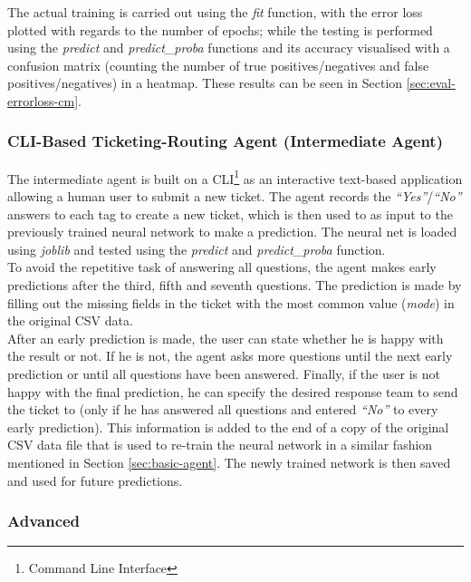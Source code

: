 \documentclass[letterpaper,12pt]{article}
\begin{document}
The actual training is carried out using the \textit{fit} function, with the error loss plotted with regards to the number of epochs; while the testing is performed using the \textit{predict} and \textit{predict\_proba} functions and its accuracy visualised with a confusion matrix (counting the number of true positives/negatives and false positives/negatives) in a heatmap. These results can be seen in Section \ref{sec:eval-errorloss-cm}.


\subsubsection{CLI-Based Ticketing-Routing Agent (Intermediate Agent)}

The intermediate agent is built on a CLI\footnote{Command Line Interface} as an interactive text-based application allowing a human user to submit a new ticket. The agent records the \textit{``Yes''}/\textit{``No''} answers to each tag to create a new ticket, which is then used to as input to the previously trained neural network to make a prediction. The neural net is loaded using \textit{joblib} and tested using the \textit{predict} and \textit{predict\_proba} function.\\

To avoid the repetitive task of answering all questions, the agent makes early predictions after the third, fifth and seventh questions. The prediction is made by filling out the missing fields in the ticket with the most common value (\textit{mode}) in the original CSV data.\\

After an early prediction is made, the user can state whether he is happy with the result or not. If he is not, the agent asks more questions until the next early prediction or until all questions have been answered. Finally, if the user is not happy with the final prediction, he can specify the desired response team to send the ticket to (only if he has answered all questions and entered \textit{``No''} to every early prediction). This information is added to the end of a copy of the original CSV data file that is used to re-train the neural network in a similar fashion mentioned in Section \ref{sec:basic-agent}. The newly trained network is then saved and used for future predictions.


\subsubsection{Advanced}
\end{document}
